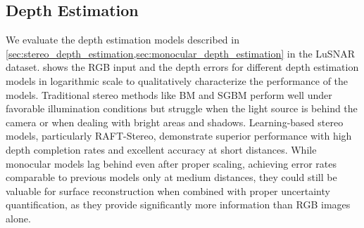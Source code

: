
\subsection{Depth Estimation}
We evaluate the depth estimation models described in \cref{sec:stereo_depth_estimation,sec:monocular_depth_estimation} in the LuSNAR dataset.
 shows the RGB input and the depth errors for different depth estimation models in logarithmic scale to qualitatively characterize the performance of the models.
Traditional stereo methods like BM and SGBM perform well under favorable illumination conditions but struggle when the light source is behind the camera or when dealing with bright areas and shadows. Learning-based stereo models, particularly RAFT-Stereo, demonstrate superior performance with high depth completion rates and excellent accuracy at short distances. While monocular models lag behind even after proper scaling, achieving error rates comparable to previous models only at medium distances, they could still be valuable for surface reconstruction when combined with proper uncertainty quantification, as they provide significantly more information than RGB images alone.


